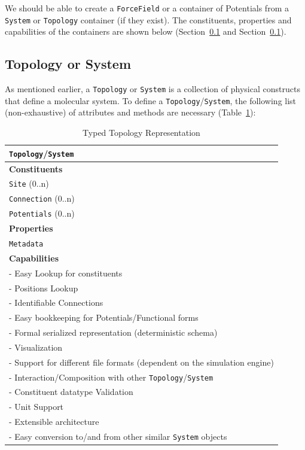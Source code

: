 \documentclass[12pt]{article}
\begin{document}
We should be able to create a \texttt{ForceField} or a container of Potentials from a \texttt{System} or \texttt{Topology} container (if they exist). The constituents, properties and capabilities of the containers are shown below (Section~\ref{def:Topology} and Section~\ref{def:Topology}).

\subsection{Topology or System}
\label{def:Topology}
As mentioned earlier, a \texttt{Topology} or \texttt{System} is a collection of physical constructs that define a molecular system. To define a \texttt{Topology}/\texttt{System}, the following list (non-exhaustive) of attributes and methods are necessary (Table~\ref{tab:TopologySpec}):

\begin{table}[ht]
    \centering
     \caption{Typed Topology Representation}
    \begin{tabular}{|l|}
         \hline
         \rowcolor{gray!50}
         \texttt{Topology}/\texttt{System}  \\
         \hline
         \textbf{Constituents} \\
         \texttt{Site} (0..n) \\
         \texttt{Connection} (0..n)\\
         \texttt{Potentials} (0..n)\\
         \hline
         \textbf{Properties}\\
         \texttt{Metadata} \\
         \hline
         \textbf{Capabilities}\\
         \hline
         - Easy Lookup for constituents \\
         - Positions Lookup \\
         - Identifiable Connections \\
         - Easy bookkeeping for Potentials/Functional forms \\
         - Formal serialized representation (deterministic schema) \\
         - Visualization \\
         - Support for different file formats (dependent on the simulation engine) \\
         - Interaction/Composition with other \texttt{Topology}/\texttt{System}\\
         - Constituent datatype Validation \\
         - Unit Support \\
         - Extensible architecture \\
         - Easy conversion to/and from other similar \texttt{System} objects\\
        \hline

    \end{tabular}
    \label{tab:TopologySpec}
\end{table}
\end{document}
